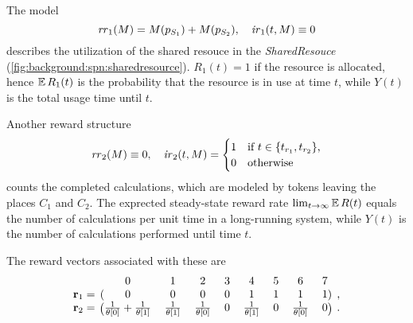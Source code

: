 \begin{runningExample}
  \label{ex:background:srn}
  The  model
  \begin{equation}
    \label{eq:background:srn:example-1}
    \mathit{rr}_1(M) = M(p_{S_1}) + M(p_{S_2}), \quad
    \mathit{ir}_1(t, M) \equiv 0
  \end{equation}
  describes the utilization of the shared resouce in the
  \emph{SharedResouce} 
  (\vref{fig:background:spn:sharedresource}). $R_1(t) = 1$ if the
  resource is allocated, hence $\operatorname{\mathbb{E}} R_1(t)$ is the probability that
  the resource is in use at time $t$, while $Y(t)$ is the total usage
  time until $t$.

  Another reward structure
  \begin{equation}
    \label{eq:background:srn:example-2}
    \mathit{rr}_2(M) \equiv 0, \quad \mathit{ir}_2(t, M) = \begin{cases}
      1 & \text{if $t \in \{t_{r_1}, t_{r_2}\}$,} \\
      0 & \text{otherwise}
    \end{cases}
  \end{equation}
  counts the completed calculations, which are modeled by tokens
  leaving the places $C_1$ and $C_2$. The exprected steady-state
  reward rate $\lim_{t \to \infty} \operatorname{\mathbb{E}} R(t)$ equals the number of
  calculations per unit time in a long-running system, while $Y(t)$ is
  the number of calculations performed until time $t$.

  The reward vectors associated with these  are
  \begin{align}
    \begin{blockarray}{l@{\mkern 15mu}*{8}{c}@{\mkern 15mu}r}
      & 0 & 1 & 2 & 3 & 4 & 5 & 6 & 7 & \\
      \begin{block}{l@{\mkern 15mu}(*{8}{c})@{\mkern 15mu}r}
        \vec{r}_1 = & 0 & 0 & 0 & 0 & 1 & 1 & 1 & 1 & \text,\\
      \end{block}
      \begin{block}{l@{\mkern 15mu}(*{8}{c})@{\mkern 15mu}r}
        \vec{r}_2 = & \frac{1}{\theta[0]} + \frac{1}{\theta[1]}
        & \frac{1}{\theta[1]} & \frac{1}{\theta[0]}
        & 0 & \frac{1}{\theta[1]} & 0 & \frac{1}{\theta[0]} & 0 & \text.\\
      \end{block}
    \end{blockarray}
  \end{align}
\end{runningExample}

